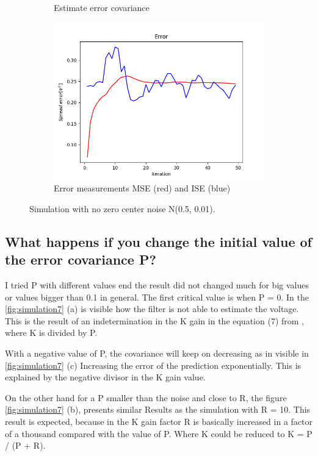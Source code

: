 \documentclass{article}
\begin{document}
\begin{figure}
\begin{subfigure} {.5\textwidth}
                \caption{Estimate error covariance}
            \end{subfigure}
            \begin{subfigure}{.5\textwidth}            
                \centering
                \includegraphics[width=0.8\linewidth]{./img/nc_E.png}
                \caption{Error measurements MSE (red) and ISE (blue)}
            \end{subfigure}
            \caption{Simulation with no zero center noise N(0.5, 0.01).}
            \label{fig:simulation6}
        \end{figure}
    
    \subsection{What happens if you change the initial value of the error covariance P?}
    
    I tried P with different values end the result did not changed much for big values or values bigger than 0.1 in general.
    The first critical value is when P = 0. In the \ref{fig:simulation7} (a) is visible how the filter is not able to estimate the
    voltage. This is the result of an indetermination in the K gain in the equation (7) from \cite{LabManual},
    where K is divided by P. 

    With a negative value of P, the covariance will keep on decreasing as  in visible in \ref{fig:simulation7} (c)
    Increasing the error of the prediction exponentially. This is explained by the negative divisor in the K gain value.
    
    On the other hand for a P smaller than the noise and close to R, the figure \ref{fig:simulation7} (b),
    presents similar Results as the simulation with R = 10. This result is expected, because in the K gain factor R is 
    basically increased in a factor of a thousand compared with the value of P. Where K could be reduced to 
    K = P / (P + R).
\end{document}
